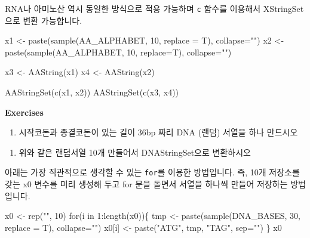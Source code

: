 \documentclass[
  a4paper,
]{book}
\newenvironment{Shaded}{\begin{snugshade}}{\end{snugshade}}
\newcommand{\AttributeTok}[1]{\textcolor[rgb]{0.40,0.45,0.13}{#1}}
\newcommand{\ControlFlowTok}[1]{\textcolor[rgb]{0.00,0.23,0.31}{#1}}
\newcommand{\DecValTok}[1]{\textcolor[rgb]{0.68,0.00,0.00}{#1}}
\newcommand{\FunctionTok}[1]{\textcolor[rgb]{0.28,0.35,0.67}{#1}}
\newcommand{\NormalTok}[1]{\textcolor[rgb]{0.00,0.23,0.31}{#1}}
\newcommand{\OtherTok}[1]{\textcolor[rgb]{0.00,0.23,0.31}{#1}}
\newcommand{\SpecialCharTok}[1]{\textcolor[rgb]{0.37,0.37,0.37}{#1}}
\newcommand{\StringTok}[1]{\textcolor[rgb]{0.13,0.47,0.30}{#1}}
\providecommand{\tightlist}{%
  \setlength{\itemsep}{0pt}\setlength{\parskip}{0pt}}\usepackage{longtable,booktabs,array}
\begin{document}
RNA나 아미노산 역시 동일한 방식으로 적용 가능하며 \texttt{c} 함수를
이용해서 XStringSet으로 변환 가능합니다.

\begin{Shaded}
\begin{Highlighting}[]
\NormalTok{x1 }\OtherTok{\textless{}{-}} \FunctionTok{paste}\NormalTok{(}\FunctionTok{sample}\NormalTok{(AA\_ALPHABET, }\DecValTok{10}\NormalTok{, }\AttributeTok{replace =}\NormalTok{ T), }\AttributeTok{collapse=}\StringTok{""}\NormalTok{)}
\NormalTok{x2 }\OtherTok{\textless{}{-}} \FunctionTok{paste}\NormalTok{(}\FunctionTok{sample}\NormalTok{(AA\_ALPHABET, }\DecValTok{10}\NormalTok{, }\AttributeTok{replace=}\NormalTok{T), }\AttributeTok{collapse=}\StringTok{""}\NormalTok{)}

\NormalTok{x3 }\OtherTok{\textless{}{-}} \FunctionTok{AAString}\NormalTok{(x1)}
\NormalTok{x4 }\OtherTok{\textless{}{-}} \FunctionTok{AAString}\NormalTok{(x2)}

\FunctionTok{AAStringSet}\NormalTok{(}\FunctionTok{c}\NormalTok{(x1, x2))}
\FunctionTok{AAStringSet}\NormalTok{(}\FunctionTok{c}\NormalTok{(x3, x4))}
\end{Highlighting}
\end{Shaded}

\textbf{Exercises}

\begin{enumerate}
\def\labelenumi{\arabic{enumi})}
\tightlist
\item
  시작코돈과 종결코돈이 있는 길이 36bp 짜리 DNA (랜덤) 서열을 하나
  만드시오
\end{enumerate}

\begin{enumerate}
\def\labelenumi{\arabic{enumi})}
\setcounter{enumi}{1}
\tightlist
\item
  위와 같은 랜덤서열 10개 만들어서 DNAStringSet으로 변환하시오
\end{enumerate}

아래는 가장 직관적으로 생각할 수 있는 \texttt{for}를 이용한 방법입니다.
즉, 10개 저장소를 갖는 x0 변수를 미리 생성해 두고 for 문을 돌면서 서열을
하나씩 만들어 저장하는 방법입니다.

\begin{Shaded}
\begin{Highlighting}[]
\NormalTok{x0 }\OtherTok{\textless{}{-}} \FunctionTok{rep}\NormalTok{(}\StringTok{""}\NormalTok{, }\DecValTok{10}\NormalTok{)}
\ControlFlowTok{for}\NormalTok{(i }\ControlFlowTok{in} \DecValTok{1}\SpecialCharTok{:}\FunctionTok{length}\NormalTok{(x0))\{}
\NormalTok{  tmp }\OtherTok{\textless{}{-}} \FunctionTok{paste}\NormalTok{(}\FunctionTok{sample}\NormalTok{(DNA\_BASES, }\DecValTok{30}\NormalTok{, }\AttributeTok{replace =}\NormalTok{ T), }\AttributeTok{collapse=}\StringTok{""}\NormalTok{)}
\NormalTok{  x0[i] }\OtherTok{\textless{}{-}} \FunctionTok{paste}\NormalTok{(}\StringTok{"ATG"}\NormalTok{, tmp, }\StringTok{"TAG"}\NormalTok{, }\AttributeTok{sep=}\StringTok{""}\NormalTok{)}
\NormalTok{\}}
\NormalTok{x0}
\end{Highlighting}
\end{Shaded}
\end{document}
